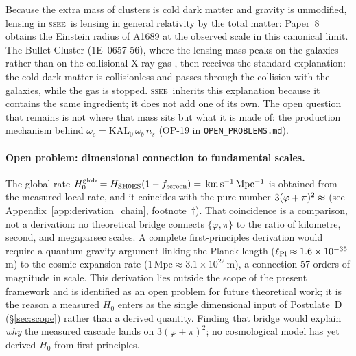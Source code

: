 \documentclass[12pt,a4paper]{article}
\newcommand{\SSEE}{\ifmmode\mathrm{SSEE}\else\textsc{ssee}\fi}
\newcommand{\KALz}{\mathrm{KAL}_0}
\newcommand{\kmsu}{\mathrm{km\,s^{-1}\,Mpc^{-1}}}
\begin{document}
Because the extra mass of clusters is cold dark matter and gravity is
unmodified, lensing in \SSEE\ is lensing in general relativity by the total
matter: Paper~8 obtains the Einstein radius of A1689 at the observed scale in
this canonical limit. The Bullet Cluster (1E~0657-56), where the lensing mass
peaks on the galaxies rather than on the collisional X-ray gas
\citep{Clowe2006}, then receives the standard explanation: the cold dark matter
is collisionless and passes through the collision with the galaxies, while the
gas is stopped. \SSEE\ inherits this explanation because it contains the same
ingredient; it does not add one of its own. The open question that remains is
not where that mass sits but what it is made of: the production mechanism behind
$\omega_c=\KALz\,\omega_b\,n_s$ (OP-19 in \texttt{OPEN\_PROBLEMS.md}).%

\paragraph{Open problem: dimensional connection to fundamental scales.}
The global rate $H_0^{\rm glob}=H_{\rm SH0ES}(1-f_{\rm screen})=\val{H0_GLOBAL_d3}\,\kmsu$
is obtained from the measured local rate, and it coincides with the pure number
$3(\varphi+\pi)^2\approx\val{H0_ALG_d3}$ (see Appendix~\ref{app:derivation_chain},
footnote~$\dagger$). That coincidence is a comparison, not a derivation: no
theoretical bridge connects $\{\varphi,\pi\}$ to the ratio of kilometre, second, and
megaparsec scales.  A complete first-principles
derivation would require a quantum-gravity argument linking the Planck length
($\ell_{\rm Pl}\approx1.6\times10^{-35}$\,m) to the cosmic expansion rate
($1\,\mathrm{Mpc}\approx3.1\times10^{22}$\,m), a connection 57 orders of magnitude
in scale.  This derivation lies outside the scope of the present framework and
is identified as an open problem for future theoretical work; it is the reason
a measured $H_0$ enters as the single dimensional input of Postulate~D
(\S\ref{sec:scope}) rather than a derived quantity. Finding that bridge would
explain \emph{why} the measured cascade lands on $3(\varphi+\pi)^2$; no
cosmological model has yet derived $H_0$ from first principles.

\end{document}
